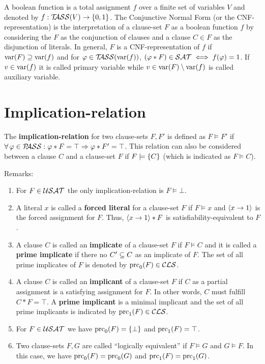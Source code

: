 \documentclass{report}
\begin{document}
A boolean function is a total assignment $f$ over a finite set of variables $V$ and denoted by $f:  \mathcal{T\hspace{-0.35em}ASS}(V) \rightarrow \{ 0,1 \}$. The Conjunctive Normal Form (or the CNF-representation) is the interpretation of a clause-set $F$ as a boolean function $f$ by considering the $F$ as the conjunction of clauses and a clause $C \in F$ as the disjunction of literals. In general, $F$ is a CNF-representation of $f$ if $\operatorname{var}(F) \supseteq \operatorname{var}(f)$ and for $\varphi \in \mathcal{T\hspace{-0.35em}ASS}(\operatorname{var}(f))$, $(\varphi * F) \in \mathcal{SAT} \iff f(\varphi) = 1$. If $v \in \operatorname{var}(f)$ it is called primary variable while $v \in \operatorname{var}(F) \setminus \operatorname{var}(f)$ is called auxiliary variable.

\section{Implication-relation}
\label{sec:imprel}

\begin{defi}\label{def:imp-rel}
The \textbf{implication-relation} for two clause-sets $F, F'$ is defined as $F \models F'$ if $\forall\, \varphi \in \mathcal{P\hspace{-0.32em}ASS} : \varphi * F = \top \Rightarrow \varphi * F' = \top$. This relation can also be considered between a clause $C$ and a clause-set $F$ if $F \models \{ C \}$ (which is indicated as $F \models C$).
\end{defi}
Remarks:
  \begin{enumerate}
  \item For  $F \in \mathcal{USAT}$ the only implication-relation is $F \models \bot$.
  \item A literal $x$ is called a \textbf{forced literal} for a clause-set $F$ if $F \models x$ and $\langle x \rightarrow 1 \rangle$ is the forced assignment for $F$. Thus,  $\langle x \rightarrow 1 \rangle * F$ is satisfiability-equivalent to $F$.
  \item A clause $C$ is called an \textbf{implicate} of a clause-set $F$ if $F \models C$ and it is called a \textbf{prime implicate} if there no $ C' \subseteq C$ as an implicate of $F$. The set of all prime implicates of $F$ is denoted by $\operatorname{prc}_0(F) \in \mathcal{CLS}$.
  \item A clause $C$ is called an \textbf{implicant} of a clause-set $F$ if $C$ as a partial assignment is a satisfying assignment for $F$. In other words, $C$ must fulfill $C * F=\top$. A \textbf{prime implicant} is a minimal implicant and the set of all prime implicants is indicated by $\operatorname{prc}_1(F) \in \mathcal{CLS}$. 
  \item For $F \in \mathcal{USAT}$ we have $\operatorname{prc}_0(F) = \{ \bot \}$ and $\operatorname{prc}_1(F) = \top$.
  \item Two clause-sets $F, G$ are called ``logically equivalent'' if $F \models G$ and $G \models F$. In this case, we have $\operatorname{prc}_0(F) = \operatorname{prc}_0(G)$ and $\operatorname{prc}_1(F) = \operatorname{prc}_1(G)$.
  \end{enumerate}
\end{document}
